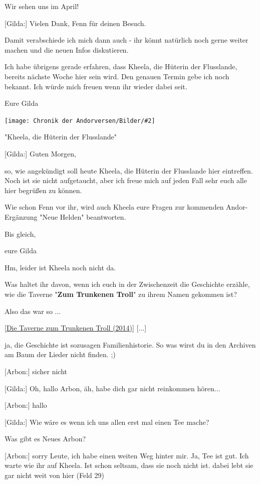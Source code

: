 \documentclass[10pt, a4paper, oneside]{book}
\newcommand{\refstorytext}[1]{\hyperref[Storytext: #1]{#1}}
\newcommand{\bildmitts}[2][height=0.32\textwidth,width=0.48\textwidth,keepaspectratio]{%
    \begin{center}
        \texttt{[image: Chronik der Andorversen/Bilder/\#2]}
    \end{center}
}
\begin{document}
\begin{multicols}{2}
Wir sehen uns im April!

[Gilda:] Vielen Dank, Fenn für deinen Besuch.

Damit verabschiede ich mich dann auch - ihr könnt natürlich noch gerne weiter machen und die neuen Infos diskutieren.

Ich habe übrigens gerade erfahren, dass Kheela, die Hüterin der Flusslande, bereits nächste Woche hier sein wird. Den genauen Termin gebe ich noch bekannt. Ich würde mich freuen wenn ihr wieder dabei seit.

Eure Gilda

\bildmitts{NH Taverne Kheela.jpg}

\begin{center}
    "Kheela, die Hüterin der Flusslande"
\end{center}

[Gilda:] Guten Morgen,

so, wie angekündigt soll heute Kheela, die Hüterin der Flusslande hier eintreffen. Noch ist sie nicht aufgetaucht, aber ich freue mich auf jeden Fall sehr euch alle hier begrüßen zu können.

Wie schon Fenn vor ihr, wird auch Kheela eure Fragen zur kommenden Andor-Ergänzung "Neue Helden" beantworten.

Bis gleich,

eure Gilda

Hm, leider ist Kheela noch nicht da.

Was haltet ihr davon, wenn ich euch in der Zwischenzeit die Geschichte erzähle, wie die Taverne "\textbf{Zum Trunkenen Troll}" zu ihrem Namen gekommen ist?

Also das war so ...

[\refstorytext{Die Taverne zum Trunkenen Troll (2014)}] [...]

ja, die Geschichte ist sozusagen Familienhistorie. So was wirst du in den Archiven am Baum der Lieder nicht finden. ;)

[Arbon:] sicher nicht

[Gilda:] Oh, hallo Arbon, äh, habe dich gar nicht reinkommen hören...

[Arbon:] hallo

[Gilda:] Wie wäre es wenn ich uns allen erst mal einen Tee mache?

Was gibt es Neues Arbon?

[Arbon:] sorry Leute, ich habe einen weiten Weg hinter mir. Ja, Tee ist gut. Ich warte wie ihr auf Kheela. Ist schon seltsam, dass sie noch nicht ist. dabei lebt sie gar nicht weit von hier (Feld 29)


\end{multicols}
\end{document}
